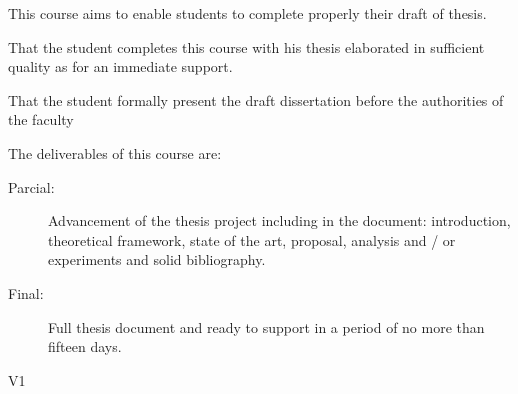 \begin{syllabus}


\begin{justification}
This course aims to enable students to complete properly their draft of  thesis.
\end{justification}

\begin{goals}
\item That the student completes this course with his thesis elaborated in sufficient quality as for an immediate support.
\item That the student formally present the draft dissertation before the authorities of the faculty
\item The deliverables of this course are:
	\begin{description}
	\item [Parcial:]Advancement of the thesis project including in the document: introduction, theoretical framework, state of the art, proposal, analysis and / or experiments and solid bibliography.
	\item [Final:] Full thesis document and ready to support in a period of no more than fifteen days.
	\end{description}
\end{goals}

\begin{outcomes}{V1}
    \item {}
    \item {}
    \item {}
    \item {}
    \item {}
    \item {}
    \item {}
    \item {}
    \item {}
    \item {}
    \item {}
\end{outcomes}


\end{syllabus}
